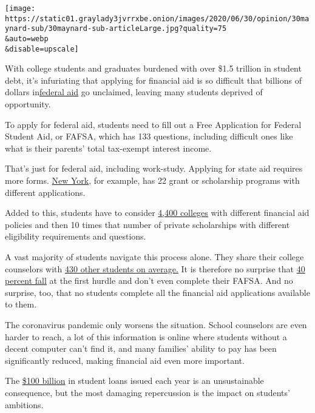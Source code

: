 \texttt{[image: https://static01.graylady3jvrrxbe.onion/images/2020/06/30/opinion/30maynard-sub/30maynard-sub-articleLarge.jpg?quality=75\\\&auto=webp\\\&disable=upscale]}

With college students and graduates burdened with over \$1.5 trillion in
student debt, it's infuriating that applying for financial aid is so
difficult that billions of dollars
in\href{https://www.nerdwallet.com/blog/2018-fafsa-study/}{federal aid}
go unclaimed, leaving many students deprived of opportunity.

To apply for federal aid, students need to fill out a Free Application
for Federal Student Aid, or FAFSA, which has 133 questions, including
difficult ones like what is their parents' total tax-exempt interest
income.

That's just for federal aid, including work-study. Applying for state
aid requires more forms.
\href{https://www.hesc.ny.gov/pay-for-college/financial-aid/types-of-financial-aid.html\#horizontalTab2}{New
York}, for example, has 22 grant or scholarship programs with different
applications.

Added to this, students have to consider
\href{https://nces.ed.gov/fastfacts/display.asp?id=84}{4,400 colleges}
with different financial aid policies and then 10 times that number of
private scholarships with different eligibility requirements and
questions.

A vast majority of students navigate this process alone. They share
their college counselors with
\href{https://www.schoolcounselor.org/asca/media/asca/home/Ratios18-19.pdf}{430
other students on average.} It is therefore no surprise that
\href{https://studentaid.gov/data-center/student/application-volume/fafsa-completion-high-school}{40
percent fall} at the first hurdle and don't even complete their FAFSA.
And no surprise, too, that no students complete all the financial aid
applications available to them.

The coronavirus pandemic only worsens the situation. School counselors
are even harder to reach, a lot of this information is online where
students without a decent computer can't find it, and many families'
ability to pay has been significantly reduced, making financial aid even
more important.

The
\href{https://research.collegeboard.org/trends/student-aid/figures-tables/total-federal-and-nonfederal-loans-type-over-time}{\$100
billion} in student loans issued each year is an unsustainable
consequence, but the most damaging repercussion is the impact on
students' ambitions.


